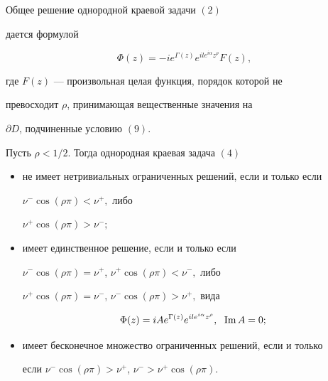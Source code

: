 \begin{thm}


Общее решение однородной краевой задачи $(2)$


дается формулой


\begin{equation}


\Phi (z)=-ie^{\Gamma (z)}e^{ile^{i\alpha}z^{\rho}}F(z),


\end{equation}


где $F(z)$ --- произвольная целая функция, порядок которой не


превосходит $\rho $, принимающая вещественные значения на


$\partial D$, подчиненные условию $(9)$.


\end{thm}





\begin{thm}


Пусть $\rho <1/2.$ Тогда однородная краевая задача $(4)$


\begin{itemize}


\item[a)] не имеет нетривиальных ограниченных решений, если и только если


$\nu^{-}\cos(\rho\pi) <\nu^{+},$ либо


$\nu^{+}\cos(\rho\pi) >\nu^{-};$


\item[b)] имеет единственное решение, если и только если


$\nu^{-}\cos(\rho\pi)=\nu^{+}$, $\nu^{+}\cos(\rho\pi) <\nu^{-},$ либо


$\nu^{+}\cos(\rho\pi)=\nu^{-}$, $\nu^{-}\cos(\rho\pi) >\nu^{+},$ вида


$$


\Phi (z)=iAe^{\Gamma (z)}e^{ile^{i\alpha}z^{\rho}},\ \;\im A=0;


$$


\item[c)] имеет бесконечное множество ограниченных решений, если и только


если $\nu^{-}\cos(\rho\pi){>}\nu^{+}$, $\nu^{-} >\nu^{+}\cos(\rho\pi).$


\end{itemize}


\end{thm}





